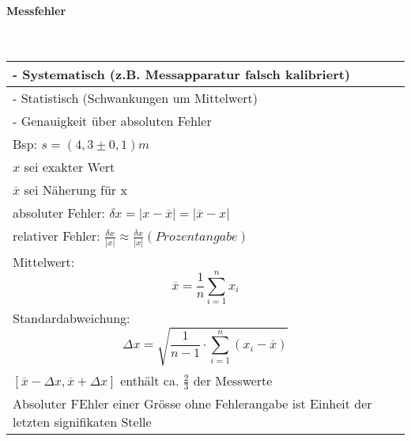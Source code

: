 \paragraph{Messfehler}\mbox{}\\
\begin{tabularx}{\columnwidth}{@{}X@{}}
	\hline
	- Systematisch (z.B. Messapparatur falsch kalibriert)                                            \\ \hline
	- Statistisch (Schwankungen um Mittelwert)                                                       \\ \hline
	- Genauigkeit über absoluten Fehler                                                              \\
	Bsp: $s = (4,3\pm 0,1) m$                                                                        \\
	$x$ sei exakter Wert                                                                             \\
	$\overline{x}$ sei Näherung für x                                                                \\ \hline
	absoluter Fehler: $\delta x= |x-\overline{x}| = |\overline{x}-x|$                                \\ \hline
	relativer Fehler: $\frac{\delta x}{|x|} \approx \frac{\delta x}{|x|} (Prozentangabe)$            \\ \hline
	Mittelwert: \[\overline{x} = \frac{1}{n} \sum_{i=1}^n x_i\]                                      \\ \hline
	Standardabweichung: \[ \Delta x = \sqrt{\frac{1}{n-1}\cdot \sum_{i=1}^n (x_i - \overline{x})} \] \\ \hline
	$[\overline{x}-\Delta x, \overline{x}+\Delta x]$ enthält ca. $\frac{2}{3}$ der Messwerte \\ \hline
	Absoluter FEhler einer Grösse ohne Fehlerangabe ist Einheit der letzten signifikaten Stelle
\end{tabularx}
\vspace{1mm}


